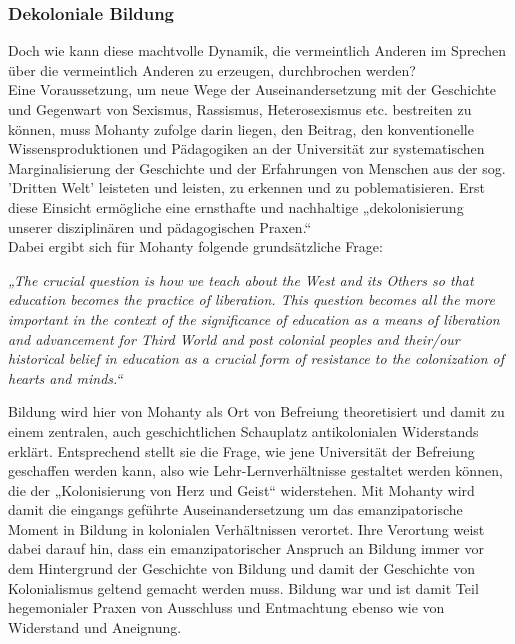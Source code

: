 \subsubsection{Dekoloniale Bildung}

\noindent  Doch wie kann diese machtvolle Dynamik, die vermeintlich Anderen im Sprechen
über die vermeintlich Anderen zu erzeugen, durchbrochen werden?\\
Eine
Voraussetzung, um neue Wege der Auseinandersetzung mit der Geschichte und
Gegenwart von Sexismus, Rassismus, Heterosexismus etc. bestreiten zu können,
muss Mohanty zufolge darin liegen, den Beitrag, den konventionelle
Wissensproduktionen und Pädagogiken an der Universität zur systematischen
Marginalisierung der Geschichte und der Erfahrungen von Menschen aus der sog.
'Dritten Welt' leisteten und leisten, zu erkennen und zu poblematisieren. Erst
diese Einsicht ermögliche eine ernsthafte und nachhaltige „dekolonisierung
unserer disziplinären und pädagogischen Praxen.“\footnotemark{}\\
Dabei ergibt sich für Mohanty
folgende grundsätzliche Frage:
\begin{myenv}
  \textit{„The crucial question is how we teach about the West and its Others
    so that education becomes the practice of liberation. This question becomes
    all the more important in the context of the significance of education as a
    means of liberation and advancement for Third World and post colonial
    peoples and their/our historical belief in education as a crucial form of
    resistance to the colonization of hearts and minds.“\footnotemark
    }
\end{myenv}
Bildung wird hier von Mohanty als Ort von Befreiung theoretisiert und damit zu
einem zentralen, auch geschichtlichen Schauplatz antikolonialen Widerstands
erklärt. Entsprechend stellt sie die Frage, wie jene Universität der Befreiung
geschaffen werden kann, also wie Lehr-Lernverhältnisse gestaltet werden können,
die der „Kolonisierung von Herz und Geist“\footnotemark{} widerstehen.  Mit Mohanty wird
damit die eingangs geführte Auseinandersetzung um das emanzipatorische Moment
in Bildung in kolonialen Verhältnissen verortet. Ihre Verortung weist dabei
darauf hin, dass ein emanzipatorischer Anspruch an Bildung immer vor dem
Hintergrund der Geschichte von Bildung und damit der Geschichte von
Kolonialismus geltend gemacht werden muss. Bildung  war und ist damit Teil
hegemonialer Praxen von Ausschluss und Entmachtung ebenso wie von Widerstand
und Aneignung.\\


